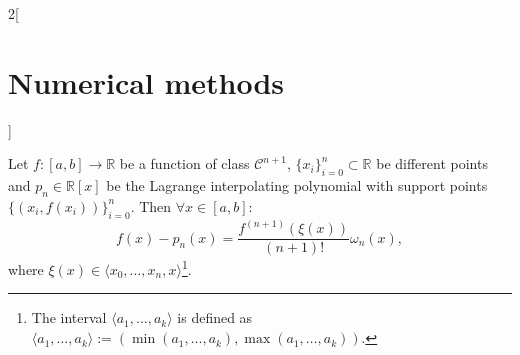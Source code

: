 \documentclass[class=article,10pt,crop=false]{standalone}
\begin{document}
\begin{multicols}{2}[\section{Numerical methods}]
\begin{prop}
\end{prop}
\begin{theorem}
Let $f:[a,b]\rightarrow\mathbb{R}$ be a function of class $\mathcal{C}^{n+1}$, $\{x_i\}_{i=0}^n\subset\mathbb{R}$ be different points and $p_n\in\mathbb{R}[x]$ be the Lagrange interpolating polynomial with support points $\{(x_i,f(x_i))\}_{i=0}^n$. Then $\forall x\in[a,b]$: $$f(x)-p_n(x)=\frac{f^{(n+1)}(\xi(x))}{(n+1)!}\omega_n(x),$$ where $\xi(x)\in\langle x_0,\ldots,x_n,x\rangle$\footnote{The interval $\langle a_1,\ldots,a_k\rangle$ is defined as $\langle a_1,\ldots,a_k\rangle:=(\min(a_1,\ldots,a_k),\max(a_1,\ldots,a_k))$.}.
\end{theorem}
\end{multicols}
\end{document}
